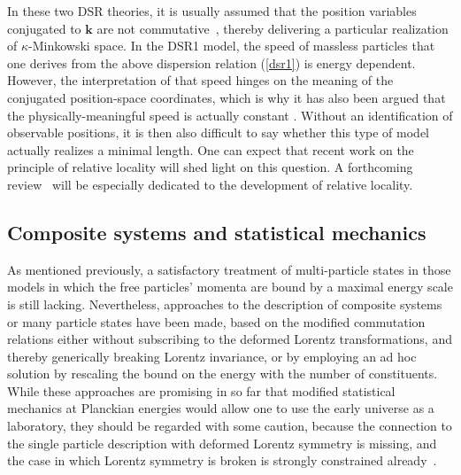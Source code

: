 \documentclass{article}
\begin{document}
In these two {\sc DSR} theories, it is usually assumed that the position variables conjugated 
to $\mathbf{k}$ are not commutative~\cite{Daszkiewicz:2003yr}, thereby delivering a particular realization of
$\kappa$-Minkowski space.  
In the {\sc DSR1} model, the speed of massless particles that one derives from
the above dispersion relation (\ref{dsr1}) is energy dependent. However, the interpretation of that
speed hinges on the meaning of the conjugated position-space coordinates, which is why it has
also been argued that the physically-meaningful speed is actually constant 
\cite{Tamaki:2001ck,Daszkiewicz:2003yr}. Without an identification of observable positions, it
is then also difficult to say whether this type of model actually realizes a minimal length.
One can expect that recent work on the principle of relative locality 
\cite{Smolin:2010xa,Smolin:2010mx,Jacob:2010vr,AmelinoCamelia:2010qv,AmelinoCamelia:2011bm,AmelinoCamelia:2011yi,Carmona:2011wc}
will shed light on this question. A forthcoming review~\cite{Jerzy} will be especially dedicated to
the development of relative locality.


\subsection{Composite systems and statistical mechanics}

As mentioned previously, a satisfactory treatment of multi-particle states in those
models in which the free particles' 
momenta are bound by a maximal energy scale is still lacking. Nevertheless, approaches to the
description of composite systems or many particle states have been made, 
based on the modified commutation
relations either without subscribing to the deformed Lorentz transformations, and thereby generically
breaking Lorentz invariance, or by employing an ad hoc solution by rescaling the bound on the energy with
the number of constituents. While these approaches are promising in so far that modified statistical
mechanics at Planckian energies would allow one to use the early universe as a laboratory, they should
be regarded with some caution, because the connection to the single particle description with
deformed Lorentz symmetry is missing, and the case in which Lorentz symmetry is broken is strongly
constrained already~\cite{Kostelecky:2008ts}.
\end{document}

